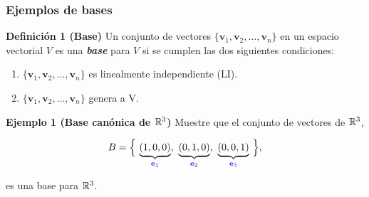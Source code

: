 {\nologo
\begin{frame}\frametitle{Ejemplos de bases}

\begin{block}{\textbf{Definición 1 (Base)}}
	\justifying
	Un conjunto de vectores $\{\mathbf{v}_1, \mathbf{v}_2, \hdots , \mathbf{v}_n \}$ en un espacio vectorial $V$ es 
	una \textbf{\textit{base}} para $V$ si se cumplen las dos siguientes condiciones:
	\begin{enumerate}
		\item[\labelname{$a$}] $\{\mathbf{v}_1, \mathbf{v}_2, \hdots , \mathbf{v}_n \}$ es linealmente independiente (LI).
		\item[\labelname{$b$}] $\{\mathbf{v}_1, \mathbf{v}_2, \hdots , \mathbf{v}_n \}$ genera a V.
	\end{enumerate}
\end{block}


\begin{ej}{\textbf{Ejemplo 1 (Base canónica de $\mathbb{R}^3$)}} \justifying
	Muestre que el conjunto de vectores de $\mathbb{R}^3$,
	
	\vspace{-2mm}
	\[
	B = \Big\{ \, \underbrace{(1,0,0)}_{\color{blue}\mathbf{e}_1}, \ \underbrace{(0,1,0)}_{\color{blue}\mathbf{e}_2}, \ 
	\underbrace{(0,0,1)}_{\color{blue}\mathbf{e}_3} \, \Big\},
	\]
	
	\vspace{-2mm}
	es una base para $\mathbb{R}^3$.
\end{ej}	

\end{frame}
}


\subsection{}

